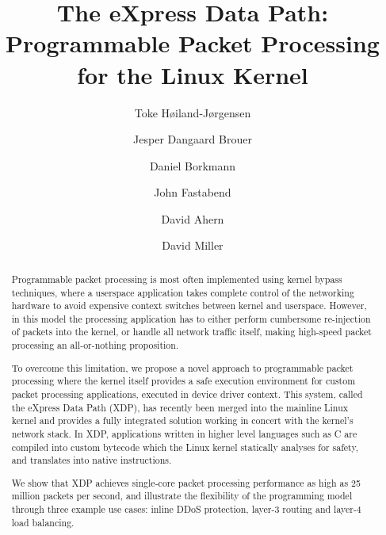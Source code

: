 \documentclass[10pt,sigconf]{acmart}
\begin{document}
\title{The eXpress Data Path: Programmable Packet Processing for the Linux Kernel}
\author{Toke Høiland-Jørgensen}

\author{Jesper Dangaard Brouer}

\author{Daniel Borkmann}

\author{John Fastabend}

\author{David Ahern}

\author{David Miller}

\renewcommand{\shortauthors}{T. Høiland-Jørgensen et al.}
\renewcommand{\shorttitle}{The eXpress Data Path}
\captionsetup{font+=small}

\begin{abstract}
  Programmable packet processing is most often implemented using kernel bypass
  techniques, where a userspace application takes complete control of the
  networking hardware to avoid expensive context switches between kernel and
  userspace. However, in this model the processing application has to either
  perform cumbersome re-injection of packets into the kernel, or handle all
  network traffic itself, making high-speed packet processing an all-or-nothing
  proposition.

  To overcome this limitation, we propose a novel approach to programmable
  packet processing where the kernel itself provides a safe execution
  environment for custom packet processing applications, executed in device
  driver context. This system, called the eXpress Data Path (XDP), has recently
  been merged into the mainline Linux kernel and provides a fully integrated
  solution working in concert with the kernel's network stack. In XDP,
  applications written in higher level languages such as C are compiled into
  custom bytecode which the Linux kernel statically analyses for safety, and
  translates into native instructions.

  We show that XDP achieves single-core packet processing performance as high as
  25 million packets per second, and illustrate the flexibility of the
  programming model through three example use cases: inline DDoS protection,
  layer-3 routing and layer-4 load balancing.
\end{abstract}
\end{document}
